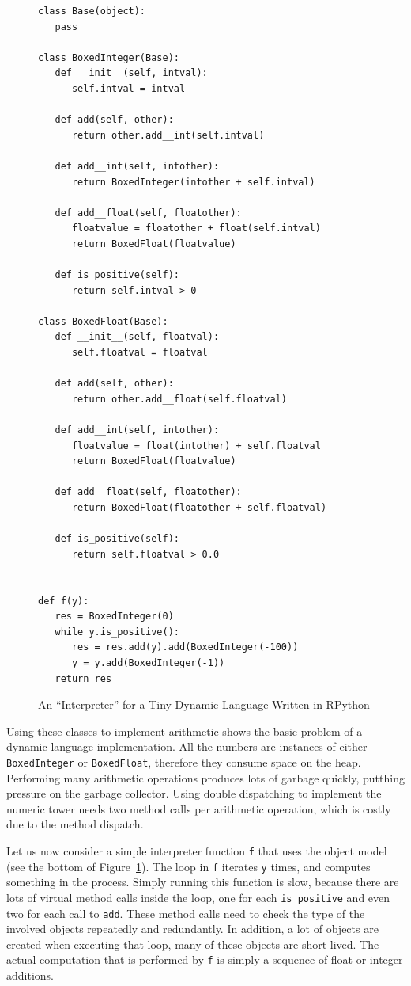 \documentclass[preprint]{sigplanconf}
\begin{document}
\begin{figure}
\begin{lstlisting}[mathescape]
class Base(object):
   pass

class BoxedInteger(Base):
   def __init__(self, intval):
      self.intval = intval

   def add(self, other):
      return other.add__int(self.intval)

   def add__int(self, intother):
      return BoxedInteger(intother + self.intval)

   def add__float(self, floatother):
      floatvalue = floatother + float(self.intval)
      return BoxedFloat(floatvalue)

   def is_positive(self):
      return self.intval > 0

class BoxedFloat(Base):
   def __init__(self, floatval):
      self.floatval = floatval

   def add(self, other):
      return other.add__float(self.floatval)

   def add__int(self, intother):
      floatvalue = float(intother) + self.floatval
      return BoxedFloat(floatvalue)

   def add__float(self, floatother):
      return BoxedFloat(floatother + self.floatval)

   def is_positive(self):
      return self.floatval > 0.0


def f(y):
   res = BoxedInteger(0)
   while y.is_positive():
      res = res.add(y).add(BoxedInteger(-100))
      y = y.add(BoxedInteger(-1))
   return res
\end{lstlisting}
\caption{An ``Interpreter'' for a Tiny Dynamic Language Written in RPython}
\label{fig:objmodel}
\end{figure}

Using these classes to implement arithmetic shows the basic problem of a
dynamic language implementation. All the numbers are instances of either
\lstinline{BoxedInteger} or \lstinline{BoxedFloat}, therefore they consume space on the
heap. Performing many arithmetic operations produces lots of garbage quickly,
putthing pressure on the garbage collector. Using double dispatching to
implement the numeric tower needs two method calls per arithmetic operation,
which is costly due to the method dispatch.

Let us now consider a simple interpreter function \lstinline{f} that uses the
object model (see the bottom of Figure~\ref{fig:objmodel}).
The loop in \lstinline{f} iterates \lstinline{y} times, and computes something in the process.
Simply running this function is slow, because there are lots of virtual method
calls inside the loop, one for each \lstinline{is_positive} and even two for each
call to \lstinline{add}. These method calls need to check the type of the involved
objects repeatedly and redundantly. In addition, a lot of objects are created
when executing that loop, many of these objects are short-lived.
The actual computation that is performed by \lstinline{f} is simply a sequence of
float or integer additions.
\end{document}
